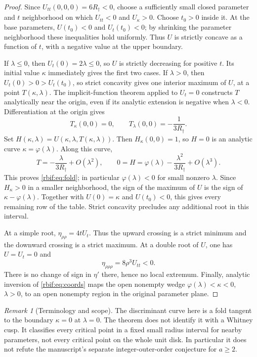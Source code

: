 \documentclass[11pt,a4paper]{article}
\theoremstyle{definition}\newtheorem{definition}[theorem]{Definition}
\theoremstyle{remark}\newtheorem{remark}[theorem]{Remark}
\newcommand{\rbrr}{R_\dagger}
\numberwithin{equation}{section}
\begin{document}
\begin{proof}
Since $U_{tt}(0,0,0)=6\rbrr<0$, choose a sufficiently small closed
parameter and $t$ neighborhood on which $U_{tt}<0$ and $U_\kappa>0$.
Choose $t_0>0$ inside it. At the base parameters,
$U(t_0)<0$ and $U_t(t_0)<0$; by shrinking the parameter neighborhood
these inequalities hold uniformly. Thus $U$ is strictly concave as a
function of $t$, with a negative value at the upper boundary.

If $\lambda\le0$, then $U_t(0)=2\lambda\le0$, so $U$ is strictly
decreasing for positive $t$. Its initial value $\kappa$ immediately
gives the first two cases.
If $\lambda>0$, then $U_t(0)>0>U_t(t_0)$, so strict concavity gives
one interior maximum of $U$, at a point $T(\kappa,\lambda)$.
The implicit-function theorem applied to $U_t=0$ constructs $T$
analytically near the origin, even if its analytic extension is negative
when $\lambda<0$. Differentiation at the origin gives
\[
 T_\kappa(0,0)=0,\qquad T_\lambda(0,0)=-\frac1{3\rbrr}.
\]
Set $H(\kappa,\lambda)=U(\kappa,\lambda,T(\kappa,\lambda))$.
Then $H_\kappa(0,0)=1$, so $H=0$ is an analytic curve
$\kappa=\varphi(\lambda)$. Along this curve,
\[
 T=-\frac{\lambda}{3\rbrr}+O(\lambda^2),\qquad
 0=H=\varphi(\lambda)-\frac{\lambda^2}{3\rbrr}+O(\lambda^3).
\]
This proves \eqref{rbif:eq:fold}; in particular $\varphi(\lambda)<0$
for small nonzero $\lambda$.
Since $H_\kappa>0$ in a smaller neighborhood, the sign of the maximum
of $U$ is the sign of $\kappa-\varphi(\lambda)$. Together with
$U(0)=\kappa$ and $U(t_0)<0$, this gives every remaining row of the table.
Strict concavity precludes any additional root in this interval.

At a simple root, $\eta_{\rho\rho}=4tU_t$. Thus the upward crossing
is a strict minimum and the downward crossing is a strict maximum.
At a double root of $U$, one has $U=U_t=0$ and
\[
 \eta_{\rho\rho\rho}=8\rho^3U_{tt}<0.
\]
There is no change of sign in $\eta'$ there, hence no local extremum.
Finally, analytic inversion of \eqref{rbif:eq:coords} maps the open
nonempty wedge $\varphi(\lambda)<\kappa<0$, $\lambda>0$, to an open
nonempty region in the original parameter plane.
\end{proof}

\begin{remark}[Terminology and scope]
The discriminant curve here is a fold tangent to the boundary
$\kappa=0$ at $\lambda=0$. The theorem does not identify it with a
Whitney cusp. It classifies every critical point in a fixed small radius
interval for nearby parameters, not every critical point on the whole
unit disk. In particular it does not refute the manuscript's separate
integer-outer-order conjecture for $a\ge2$.
\end{remark}
\end{document}
